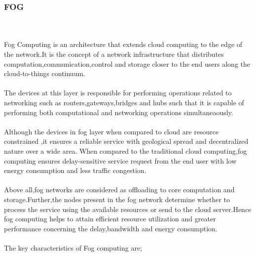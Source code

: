 \subsubsection{FOG}
\hfill\\
\hfill\\
Fog Computing is an architecture that extends cloud computing to the edge of the network.It is the concept of a network infrastructure that distributes computation,communication,control and storage closer to the end users along the cloud-to-things continuum\cite{chiang2016fog}.\\ \\
The devices at this layer is responsible for performing operations related to networking such as routers,gateways,bridges and hubs such that it is capable of performing both computational and networking operations simultaneaously.\\ \\
Although the devices in fog layer when compared to cloud are resource constrained ,it ensures a reliable service with geological spread and decentralized nature over a wide area. When compared to the traditional cloud computing,fog computing ensures delay-sensitive service request from the end user with low energy consumption and less traffic congestion\cite{11}.\\ \\
Above all,fog networks are considered as offloading to core computation and storage.Further,the nodes present in the fog network determine whether to process the service using the available resources or send to the cloud server.Hence fog computing helps to attain efficient resource utilization and greater performance concerning the delay,bandwidth and energy consumption\cite{11}.\\ \\
The key characteristics of Fog computing are;\\
